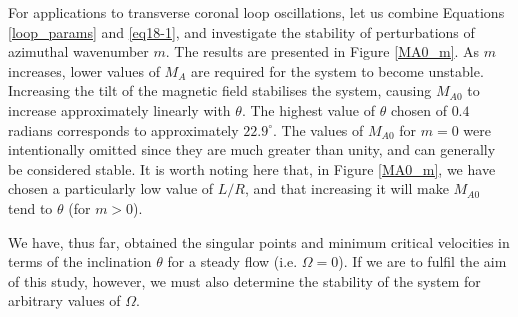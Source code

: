 \documentclass[12pt]{ociamthesis}
\begin{document}
For applications to transverse coronal loop oscillations, let us combine Equations \eqref{loop_params} and \eqref{eq18-1}, and investigate the stability of perturbations of azimuthal wavenumber $m$.
The results are presented in Figure \ref{MA0_m}. As $m$ increases, lower values of $M_A$ are required for the system to become unstable.
Increasing the tilt of the magnetic field stabilises the system, causing $M_{A0}$ to increase approximately linearly with $\theta$.
The highest value of $\theta$ chosen of $0.4$ radians corresponds to approximately $22.9^\circ$.
The values of $M_{A0}$ for $m=0$ were intentionally omitted since they are much greater than unity, and can generally be considered stable.
It is worth noting here that, in Figure \ref{MA0_m}, we have chosen a particularly low value of $L/R$, and that increasing it will make $M_{A0}$ tend to $\theta$ (for $m > 0$).

We have, thus far, obtained the singular points and minimum critical velocities in terms of the inclination $\theta$ for a steady flow (i.e. $\Omega = 0$).
If we are to fulfil the aim of this study, however, we must also determine the stability of the system for arbitrary values of $\Omega$.
\end{document}
